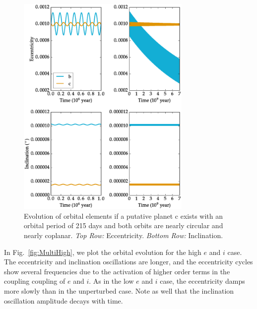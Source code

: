 \documentclass[preprint,12pt]{aastex}
\begin{document}
\begin{figure} 
\begin{center}
\includegraphics[width=0.75\textwidth]{MultiLow2.eps}
\end{center}
\caption{Evolution of orbital elements if a putative planet c exists with an 
orbital period of 215 days and both orbits are nearly circular and nearly 
coplanar. {\it Top Row:} Eccentricity. {\it Bottom Row:} Inclination.}
\label{fig:MultiLow}
\end{figure}

In Fig.~\ref{fig:MultiHigh}, we plot the orbital evolution for the
high $e$ and $i$ case. The eccentricity and inclination oscillations
are longer, and the eccentricity cycles show several frequencies due
to the activation of higher order terms in the coupling coupling of $e$ and
$i$. As in the low $e$ and $i$ case, the eccentricity damps more
slowly than in the unperturbed case. Note as well that the inclination
oscillation amplitude decays with time.
\end{document}

